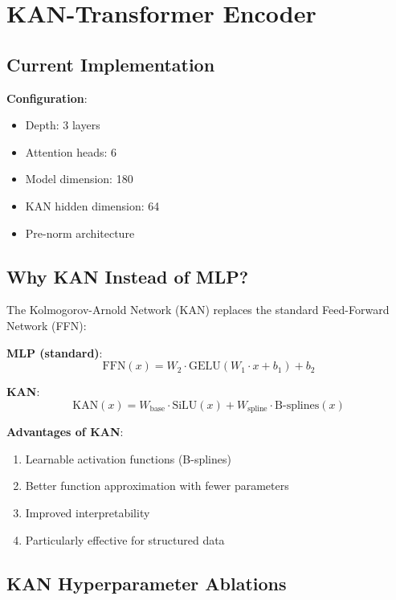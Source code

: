 \documentclass[11pt,a4paper]{article}
\begin{document}
\section{KAN-Transformer Encoder}

\subsection{Current Implementation}

\textbf{Configuration}:
\begin{itemize}
    \item Depth: 3 layers
    \item Attention heads: 6
    \item Model dimension: 180
    \item KAN hidden dimension: 64
    \item Pre-norm architecture
\end{itemize}

\subsection{Why KAN Instead of MLP?}

The Kolmogorov-Arnold Network (KAN) replaces the standard Feed-Forward Network (FFN):

\textbf{MLP (standard)}:
\begin{equation}
\text{FFN}(x) = W_2 \cdot \text{GELU}(W_1 \cdot x + b_1) + b_2
\end{equation}

\textbf{KAN}:
\begin{equation}
\text{KAN}(x) = W_{\text{base}} \cdot \text{SiLU}(x) + W_{\text{spline}} \cdot \text{B-splines}(x)
\end{equation}

\textbf{Advantages of KAN}:
\begin{enumerate}
    \item Learnable activation functions (B-splines)
    \item Better function approximation with fewer parameters
    \item Improved interpretability
    \item Particularly effective for structured data
\end{enumerate}

\subsection{KAN Hyperparameter Ablations}
\end{document}

